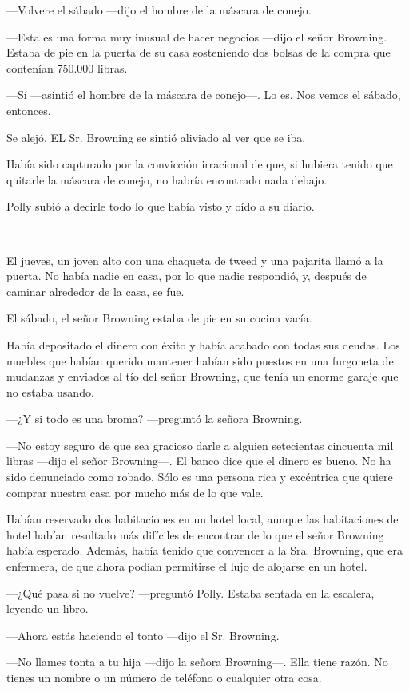 ---Volvere el sábado ---dijo el hombre de la máscara de conejo.

---Esta es una forma muy inusual de hacer negocios ---dijo el señor Browning. Estaba de pie en la puerta de su casa sosteniendo dos bolsas de la compra que contenían 750.000 libras.

---Sí ---asintió el hombre de la máscara de conejo---. Lo es. Nos vemos el sábado, entonces.

Se alejó. EL Sr. Browning se sintió aliviado al ver que se iba.

Había sido capturado por la convicción irracional de que, si hubiera tenido que quitarle la máscara de conejo, no habría encontrado nada debajo.

Polly subió a decirle todo lo que había visto y oído a su diario.

~

El jueves, un joven alto con una chaqueta de tweed y una pajarita llamó a la puerta. No había nadie en casa, por lo que nadie respondió, y, después de caminar alrededor de la casa, se fue.

El sábado, el señor Browning estaba de pie en su cocina vacía.

Había depositado el dinero con éxito y había acabado con todas sus deudas. Los muebles que habían querido mantener habían sido puestos en una furgoneta de mudanzas y enviados al tío del señor Browning, que tenía un enorme garaje que no estaba usando.

---¿Y si todo es una broma? ---preguntó la señora Browning.

---No estoy seguro de que sea gracioso darle a alguien setecientas cincuenta mil libras ---dijo el señor Browning---. El banco dice que el dinero es bueno. No ha sido denunciado como robado. Sólo es una persona rica y excéntrica que quiere comprar nuestra casa por mucho más de lo que vale.

Habían reservado dos habitaciones en un hotel local, aunque las habitaciones de hotel habían resultado más difíciles de encontrar de lo que el señor Browning había esperado. Además, había tenido que convencer a la Sra. Browning, que era enfermera, de que ahora podían permitirse el lujo de alojarse en un hotel.

---¿Qué pasa si no vuelve? ---preguntó Polly. Estaba sentada en la escalera, leyendo un libro.

---Ahora estás haciendo el tonto ---dijo el Sr. Browning.

---No llames tonta a tu hija ---dijo la señora Browning---. Ella tiene razón. No tienes un nombre o un número de teléfono o cualquier otra cosa.

